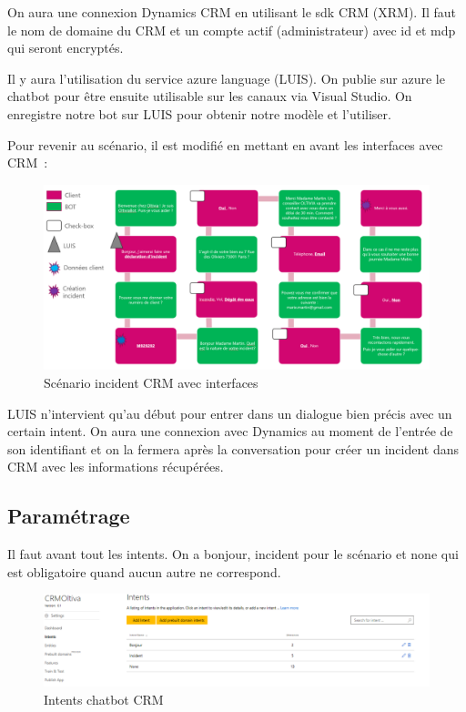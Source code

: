 On aura une connexion Dynamics CRM en utilisant le sdk CRM (XRM). Il faut le nom de domaine du CRM et un compte actif (administrateur) avec id et mdp qui seront encryptés.
\vspace{1em}

Il y aura l’utilisation du service azure language (LUIS). On publie sur azure le chatbot pour être ensuite utilisable sur les canaux via Visual Studio. On enregistre notre bot sur LUIS pour obtenir notre modèle et l’utiliser.
\vspace{1em}

Pour revenir au scénario, il est modifié en mettant en avant les interfaces avec CRM :

\begin{figure}[H]
	\centering
		\includegraphics[width = \textwidth]{scenarioInterface.png}
	\caption{Scénario incident CRM avec interfaces}
	\label{fig:Scénario incident CRM avec interfaces}
\end{figure}


LUIS n’intervient qu’au début pour entrer dans un dialogue bien précis avec un certain intent. On aura une connexion avec Dynamics au moment de l’entrée de son identifiant et on la fermera après la conversation pour créer un incident dans CRM avec les informations récupérées.

\subsection{Paramétrage}

Il faut avant tout les intents. On a bonjour, incident pour le scénario et none qui est obligatoire quand aucun autre ne correspond.

\begin{figure}[H]
	\centering
		\includegraphics[width = \textwidth]{intent.png}
	\caption{Intents chatbot CRM}
	\label{fig:Intents chatbot CRM}
\end{figure}


